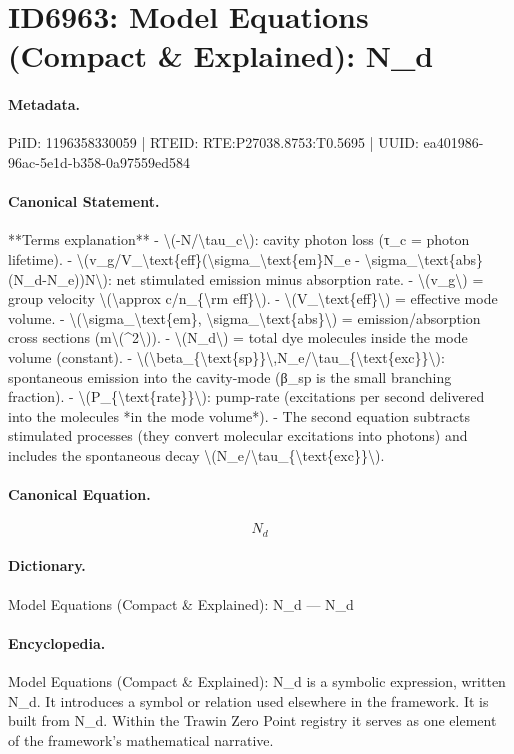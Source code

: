 \section*{ID6963: Model Equations (Compact \& Explained): N\_d}
\paragraph{Metadata.}
PiID: 1196358330059 | RTEID: RTE:P27038.8753:T0.5695 | UUID: ea401986-96ac-5e1d-b358-0a97559ed584

\paragraph{Canonical Statement.}
**Terms explanation** - \textbackslash{}(-N/\textbackslash{}tau\_c\textbackslash{}): cavity photon loss (τ\_c = photon lifetime). - \textbackslash{}(v\_g/V\_\textbackslash{}text\{eff\}(\textbackslash{}sigma\_\textbackslash{}text\{em\}N\_e - \textbackslash{}sigma\_\textbackslash{}text\{abs\}(N\_d-N\_e))N\textbackslash{}): net stimulated emission minus absorption rate. - \textbackslash{}(v\_g\textbackslash{}) = group velocity \textbackslash{}(\textbackslash{}approx c/n\_\{\textbackslash{}rm eff\}\textbackslash{}). - \textbackslash{}(V\_\textbackslash{}text\{eff\}\textbackslash{}) = effective mode volume. - \textbackslash{}(\textbackslash{}sigma\_\textbackslash{}text\{em\}, \textbackslash{}sigma\_\textbackslash{}text\{abs\}\textbackslash{}) = emission/absorption cross sections (m\textbackslash{}(\textasciicircum{}2\textbackslash{})). - \textbackslash{}(N\_d\textbackslash{}) = total dye molecules inside the mode volume (constant). - \textbackslash{}(\textbackslash{}beta\_\{\textbackslash{}text\{sp\}\}\textbackslash{},N\_e/\textbackslash{}tau\_\{\textbackslash{}text\{exc\}\}\textbackslash{}): spontaneous emission into the cavity-mode (β\_sp is the small branching fraction). - \textbackslash{}(P\_\{\textbackslash{}text\{rate\}\}\textbackslash{}): pump-rate (excitations per second delivered into the molecules *in the mode volume*). - The second equation subtracts stimulated processes (they convert molecular excitations into photons) and includes the spontaneous decay \textbackslash{}(N\_e/\textbackslash{}tau\_\{\textbackslash{}text\{exc\}\}\textbackslash{}).

\paragraph{Canonical Equation.}
\[
N_d
\]

\paragraph{Dictionary.}
Model Equations (Compact \& Explained): N\_d — N\_d

\paragraph{Encyclopedia.}
Model Equations (Compact \& Explained): N\_d is a symbolic expression, written N\_d. It introduces a symbol or relation used elsewhere in the framework. It is built from N\_d. Within the Trawin Zero Point registry it serves as one element of the framework's mathematical narrative.
